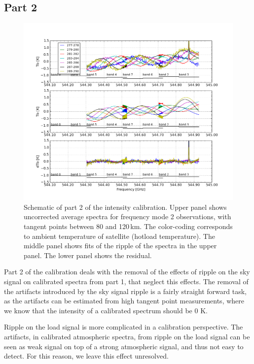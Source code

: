 \subsection*{Part 2}

\begin{figure}[t]
\includegraphics[width=14cm]{calibration_step2_fig.png}
\caption{Schematic of part 2 of the intensity calibration.
Upper panel shows uncorrected average spectra for frequency mode 2 observations,
with tangent points between 80 and 120\,km. The color-coding corresponds
to ambient temperature of satellite (hotload temperature).
The middle panel shows fits of the ripple of the spectra in the 
upper panel. The lower panel shows the residual.}
\label{fig:ripple1}
\end{figure}



Part 2 of the calibration deals with the removal
of the effects of ripple on the sky signal on calibrated
spectra from part 1, that neglect this effects.
The removal of the artifacts introduced by the sky signal
ripple is a fairly straight forward task, as the artifacts
can be estimated from high tangent point measurements,
where we know that the intensity of a calibrated spectrum should be 0 K.

Ripple on the load signal is more complicated in 
a calibration perspective. The artifacts, in calibrated
atmospheric spectra, from ripple on the
load signal can be seen as weak signal on top of a strong
atmospheric signal, and thus not easy to detect.
For this reason, we leave this effect unresolved.

